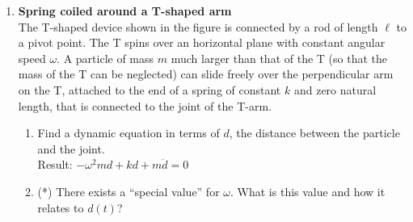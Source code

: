 \documentclass[11pt, a4paper, twoside]{article}
\begin{document}
\begin{enumerate}
\item
	\begin{minipage}[t][3.9cm]{0.75\textwidth}
		\textbf{Spring coiled around a T-shaped arm}\\
		The T-shaped device shown in the figure is connected by a rod of length \(\ell\) to a pivot point.
		The T spins over an horizontal plane with constant angular speed \(\omega\).
		A particle of mass \(m\) much larger than that of the T (so that the mass of the T can be neglected) can slide freely over the perpendicular arm on the T, attached to the end of a spring of constant \(k\) and zero natural length, that is connected to the joint of the T-arm.
	\end{minipage}
	\begin{minipage}[c][1cm][t]{0.3\textwidth}
		
	\end{minipage}
	\begin{enumerate}
		\item Find a dynamic equation in terms of \(d\), the distance between the particle and the joint.\\
		Result: \(- \omega^{2} m d + k d + m \ddot{d} = 0\)
		\item (*) There exists a ``special value'' for \(\omega\). What is this value and how it relates to \(d(t)\)?
	\end{enumerate}


\end{enumerate}
\end{document}

